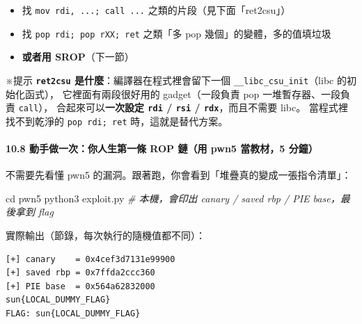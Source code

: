\documentclass[10pt,a4paper]{article}
\newenvironment{Shaded}{\begin{snugshade}}{\end{snugshade}}
\newcommand{\BuiltInTok}[1]{#1}
\newcommand{\CommentTok}[1]{\textcolor[rgb]{0.56,0.35,0.01}{\textit{#1}}}
\newcommand{\ExtensionTok}[1]{#1}
\newcommand{\NormalTok}[1]{#1}
\renewenvironment{Shaded}{%
  \def\FrameCommand{\fboxsep=3.2pt\colorbox{shadecolor}}%
  \MakeFramed{\advance\hsize-\width\FrameRestore\small}%
}{%
  \endMakeFramed
}
\providecommand{\tightlist}{%
  \setlength{\itemsep}{0pt}\setlength{\parskip}{0pt}}
\renewenvironment{quote}{%
  \begin{mdframed}[linewidth=0pt,innerleftmargin=0pt,innerrightmargin=0pt,
    innerbottommargin=0pt,innertopmargin=0pt,skipabove=0.55em,skipbelow=0.55em,
    leftmargin=0.9em,rightmargin=0.4em,startcode={\color{quotebar}\vrule width 2.6pt},%
    endcode={}]%
  \itshape\color{black}%
}{%
  \end{mdframed}%
}
\begin{document}
\begin{itemize}
\tightlist
\item
  找 \texttt{mov\ \allowbreak{}rdi,\allowbreak{}\ \allowbreak{}...;\ \allowbreak{}call\ \allowbreak{}...} 之類的片段（見下面「ret2csu」）
\item
  找 \texttt{pop\ \allowbreak{}rdi;\ \allowbreak{}pop\ \allowbreak{}rXX;\ \allowbreak{}ret} 之類「多 pop
  幾個」的變體，多的值填垃圾
\item
  \textbf{或者用 SROP}（下一節）
\end{itemize}

\begin{quote}
※提示 \textbf{\texttt{ret2csu} 是什麼}：編譯器在程式裡會留下一個
\texttt{\_\allowbreak{}\_\allowbreak{}libc\_\allowbreak{}csu\_\allowbreak{}init}（libc 的初始化函式）， 它裡面有兩段很好用的
gadget（一段負責 pop 一堆暫存器、一段負責 \texttt{call}），
合起來可以\textbf{一次設定 \texttt{rdi} / \texttt{rsi} /
\texttt{rdx}}，而且不需要 libc。 當程式裡找不到乾淨的
\texttt{pop\ \allowbreak{}rdi;\ \allowbreak{}ret} 時，這就是替代方案。
\end{quote}

\paragraph{10.8 動手做一次：你人生第一條 ROP 鏈（用 pwn5 當教材，5
分鐘）}\label{ux52d5ux624bux505aux4e00ux6b21ux4f60ux4ebaux751fux7b2cux4e00ux689d-rop-ux93c8ux7528-pwn5-ux7576ux6559ux67505-ux5206ux9418}

不需要先看懂 pwn5 的漏洞。跟著跑，你會看到「堆疊真的變成一張指令清單」：

\begin{Shaded}
\begin{Highlighting}[]
\BuiltInTok{cd}\NormalTok{ pwn5}
\ExtensionTok{python3}\NormalTok{ exploit.py         }\CommentTok{\# 本機，會印出 canary / saved rbp / PIE base，最後拿到 flag}
\end{Highlighting}
\end{Shaded}

實際輸出（節錄，每次執行的隨機值都不同）：

\begin{Verbatim}[breaklines=true,breakanywhere=true,breakautoindent=false,fontsize=\fontsize{7.0}{9.5}\selectfont]
[+] canary    = 0x4cef3d7131e99900
[+] saved rbp = 0x7ffda2ccc360
[+] PIE base  = 0x564a62832000
sun{LOCAL_DUMMY_FLAG}
FLAG: sun{LOCAL_DUMMY_FLAG}
\end{Verbatim}
\end{document}
